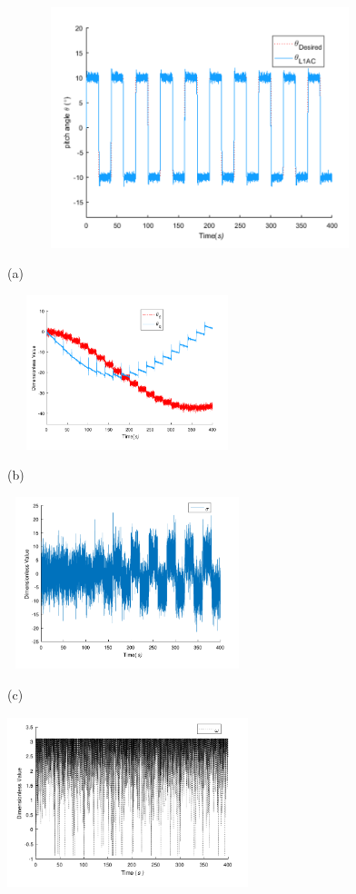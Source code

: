 \begin{figure}[!htp]
\centering
\begin{minipage}{0.8\linewidth}
  \centerline{\includegraphics[width=13.0cm,height = 7cm]{figure/chap5/linear/L1AC/L1AC_x.pdf}}
  \centerline{(a) }
\end{minipage}
\vfill
\begin{minipage}{0.48\linewidth}
  \centerline{\includegraphics[width=7.0cm,height = 4.5cm]{figure/chap5/linear/L1AC/Theta.pdf}}
  \centerline{(b) }
\end{minipage}
\hfill
\begin{minipage}{0.48\linewidth}
  \centerline{\includegraphics[width=7.0cm,height = 5cm]{figure/chap5/linear/L1AC/Sigma.pdf}}
  \centerline{(c) }
\end{minipage}
\vfill
\begin{minipage}{0.48\linewidth}
  \centerline{\includegraphics[width=7.0cm,height = 5cm]{figure/chap5/linear/L1AC/omega.pdf}}

\end{minipage}
\end{figure}
